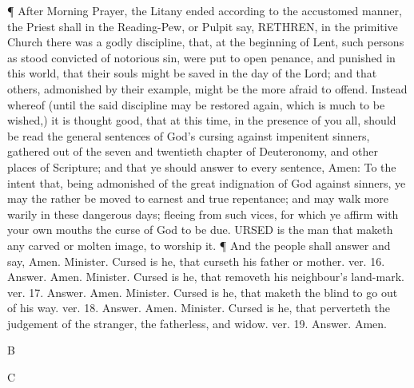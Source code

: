 ¶ After Morning Prayer, the Litany ended according to the accustomed manner, the Priest shall in the Reading-Pew, or Pulpit say, RETHREN, in the primitive Church there was a godly discipline, that, at the beginning of Lent, such persons as stood convicted of notorious sin, were put to open penance, and punished in this world, that their souls might be saved in the day of the Lord; and that others, admonished by their example, might be the more afraid to offend. Instead whereof (until the said discipline may be restored again, which is much to be wished,) it is thought good, that at this time, in the presence of you all, should be read the general sentences of God’s cursing against impenitent sinners, gathered out of the seven and twentieth chapter of Deuteronomy, and other places of Scripture; and that ye should answer to every sentence, Amen: To the intent that, being admonished of the great indignation of God against sinners, ye may the rather be moved to earnest and true repentance; and may walk more warily in these dangerous days; fleeing from such vices, for which ye affirm with your own mouths the curse of God to be due. URSED is the man that maketh any carved or molten image, to worship it. ¶ And the people shall answer and say, Amen. Minister. Cursed is he, that curseth his father or mother. ver. 16. Answer. Amen. Minister. Cursed is he, that removeth his neighbour’s land-mark. ver. 17. Answer. Amen. Minister. Cursed is he, that maketh the blind to go out of his way. ver. 18. Answer. Amen. Minister. Cursed is he, that perverteth the judgement of the stranger, the fatherless, and widow. ver. 19. Answer. Amen.

B

C

